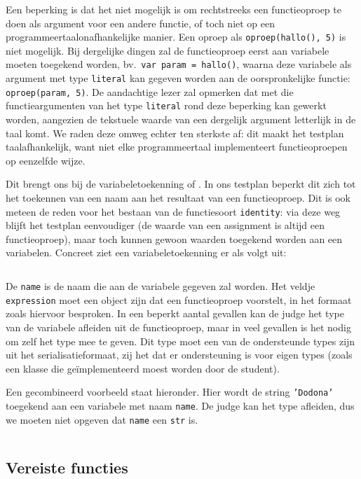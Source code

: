 Een beperking is dat het niet mogelijk is om rechtstreeks een functieoproep te doen als argument voor een andere functie,
of toch niet op een programmeertaalonafhankelijke manier.
Een oproep als \texttt{oproep(hallo(), 5)} is niet mogelijk.
Bij dergelijke dingen zal de functieoproep eerst aan variabele moeten toegekend worden, bv.\ \texttt{var param = hallo()}, waarna deze variabele als argument met type \texttt{literal} kan gegeven worden aan de oorspronkelijke functie: \texttt{oproep(param, 5)}.
De aandachtige lezer zal opmerken dat met die functieargumenten van het type \texttt{literal} rond deze beperking kan gewerkt worden, aangezien de tekstuele waarde van een dergelijk argument letterlijk in de taal komt.
We raden deze omweg echter ten sterkste af: dit maakt het testplan taalafhankelijk, want niet elke programmeertaal implementeert functieoproepen op eenzelfde wijze.

Dit brengt ons bij de variabeletoekenning of .
In ons testplan beperkt dit zich tot het toekennen van een naam aan het resultaat van een functieoproep.
Dit is ook meteen de reden voor het bestaan van de functiesoort \texttt{identity}: via deze weg blijft het testplan eenvoudiger (de waarde van een assignment is altijd een functieoproep), maar toch kunnen gewoon waarden toegekend worden aan een variabelen.
Concreet ziet een variabeletoekenning er als volgt uit:

\inputminted{json}{code/assignment.json}

De \texttt{name} is de naam die aan de variabele gegeven zal worden.
Het veldje \texttt{expression} moet een object zijn dat een functieoproep voorstelt, in het formaat zoals hiervoor besproken.
In een beperkt aantal gevallen kan de judge het type van de variabele afleiden uit de functieoproep, maar in veel gevallen is het nodig om zelf het type mee te geven.
Dit type moet een van de ondersteunde types zijn uit het serialisatieformaat, zij het dat er ondersteuning is voor eigen types (zoals een klasse die geïmplementeerd moest worden door de student).

Een gecombineerd voorbeeld staat hieronder.
Hier wordt de string \texttt{'Dodona'} toegekend aan een variabele met naam \texttt{name}.
De judge kan het type afleiden, dus we moeten niet opgeven dat \texttt{name} een \texttt{str} is.

\inputminted{json}{code/assign-variable.json}

\subsection{Vereiste functies}\label{subsec:vereiste-functies}

